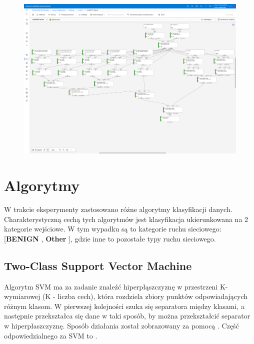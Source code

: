 \begin{landscape}
\begin{figure}[H]
    \centering
    \includegraphics[height=0.9\textwidth]{images/pipeline}
    \label{fig:pipeline}
\end{figure}
\end{landscape}

\section{Algorytmy}
W trakcie eksperymenty zastosowano różne algorytmy klasyfikacji danych. Charakterystyczną cechą tych algorytmów jest klasyfikacja ukierunkowana na 2 kategorie wejściowe. W tym wypadku są to kategorie ruchu sieciowego: [\textbf{BENIGN} , \textbf{Other} ], gdzie inne to pozostałe typy ruchu sieciowego.
\subsection{Two-Class Support Vector Machine}

Algorytm SVM ma za zadanie znaleźć hiperpłąszczyznę w przestrzeni K-wymiarowej (K - liczba cech), która rozdziela zbiory punktów odpowiadających różnym klasom. W pierwszej kolejności szuka się separatora między klasami, a następnie przekształca się dane w taki sposób, by można przekształcić separator w hiperpłaszczyznę\cite{IBM}. Sposób działania został zobrazowany za pomocą . Część  odpowiedzialnego za SVM to .


